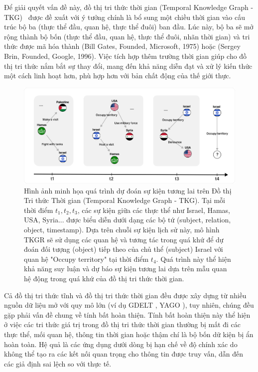 Để giải quyết vấn đề này, đồ thị tri thức thời gian (Temporal Knowledge Graph - TKG)~\cite{ref_article02} được đề xuất với ý tưởng chính là bổ sung một chiều thời gian vào cấu trúc bộ ba (thực thể đầu, quan hệ, thực thể đuôi) ban đầu. Lúc này, bộ ba sẽ mở rộng thành bộ bốn (thực thể đầu, quan hệ, thực thể đuôi, nhãn thời gian) và tri thức được mã hóa thành (Bill Gates, Founded, Microsoft, 1975) hoặc (Sergey Brin, Founded, Google, 1996). Việc tích hợp thêm trường thời gian giúp cho đồ thị tri thức nắm bắt sự thay đổi, mang đến khả năng diễn đạt và xử lý kiến thức một cách linh hoạt hơn, phù hợp hơn với bản chất động của thế giới thực.

\begin{figure}[h!]
\centering
\includegraphics[width=15cm]{images/TKGexample1.png}
\caption{Hình ảnh minh họa quá trình dự đoán sự kiện tương lai trên Đồ thị Tri thức Thời gian (Temporal Knowledge Graph - TKG). Tại mỗi thời điểm $t_1, t_2, t_3$, các sự kiện giữa các thực thể như Israel, Hamas, USA, Syria... được biểu diễn dưới dạng các bộ tứ (subject, relation, object, timestamp). Dựa trên chuỗi sự kiện lịch sử này, mô hình TKGR sẽ sử dụng các quan hệ và tương tác trong quá khứ để dự đoán đối tượng (object) tiếp theo của chủ thể (subject) Israel với quan hệ "Occupy territory" tại thời điểm $t_4$. Quá trình này thể hiện khả năng suy luận và dự báo sự kiện tương lai dựa trên mẫu quan hệ động trong quá khứ của đồ thị tri thức thời gian.}
\label{fig:chatbots_classification}
\end{figure}

Cả đồ thị tri thức tĩnh và đồ thị tri thức thời gian đều được xây dựng từ nhiều nguồn dữ liệu mở với quy mô lớn (ví dụ GDELT \cite{ref_article20}, YAGO \cite{ref_article21}), tuy nhiên, chúng đều gặp phải vấn đề chung về tính bất hoàn thiện. Tính bất hoàn thiện này thể hiện ở việc các tri thức giá trị trong đồ thị tri thức thời gian thường bị mất đi các thực thể, mối quan hệ, thông tin thời gian hoặc thậm chí là bộ bốn dữ kiện bị ẩn hoàn toàn. Hệ quả là các ứng dụng dưới dòng bị hạn chế về độ chính xác do không thể tạo ra các kết nối quan trọng cho thông tin được truy vấn, dẫn đến các giả định sai lệch so với thực tế.

